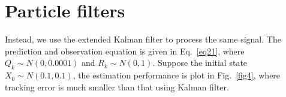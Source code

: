 \documentclass[conference]{IEEEtran}
\begin{document}
	\section{Particle filters}

	Instead, we use the extended Kalman filter to process the same signal. The prediction and observation equation is given in Eq.~\ref{eq21}, where $Q_{k}\sim N(0,0.0001)$ and $R_{k}\sim N(0,1)$. Suppose the initial state $X_{0}\sim N(0.1,0.1)$, the estimation performance is plot in Fig.~\ref{fig4}, where tracking error is much smaller than that using Kalman filter.
	
	\newpage
	
	\newpage
	
	
	
	
\end{document}
